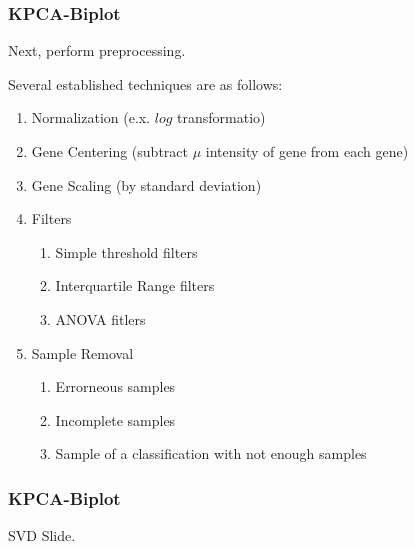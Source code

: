 \documentclass[serif ]{beamer}
\begin{document}
	\begin{frame}
		\frametitle{KPCA-Biplot}
		Next, perform preprocessing. \newline

		Several established techniques are as follows:
			\begin{enumerate}
				\item Normalization (e.x. $log$ transformatio)
				\item Gene Centering (subtract $\mu$ intensity of gene from each gene)
				\item Gene Scaling (by standard deviation)
				\item Filters
					\begin{enumerate}
						\item Simple threshold filters
						\item Interquartile Range filters
						\item ANOVA fitlers
					\end{enumerate}
				\item Sample Removal
					\begin{enumerate}
						\item Errorneous samples
						\item Incomplete samples
						\item Sample of a classification with not enough samples
					\end{enumerate}
			\end{enumerate}		

		\note
		{

		}

	\end{frame}

	\begin{frame}
		\frametitle{KPCA-Biplot}

		SVD Slide.
				
	\end{frame}
\end{document}
